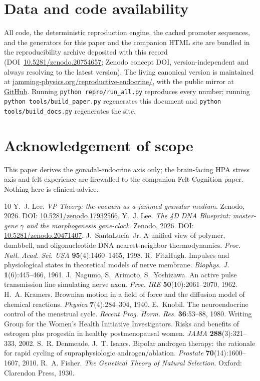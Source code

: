 \documentclass[11pt]{article}
\begin{document}
\section*{Data and code availability}
All code, the deterministic reproduction engine, the cached promoter sequences, and the generators for this
paper and the companion HTML site are bundled in the reproducibility archive deposited with this record
(DOI~\href{https://doi.org/10.5281/zenodo.20754657}{10.5281/zenodo.20754657}; Zenodo concept DOI, version-independent and
always resolving to the latest version). The living canonical version is maintained at
\href{https://jamming-physics.org/reproductive-endocrine/}{jamming-physics.org/reproductive-endocrine/}, with the public mirror at
\href{https://github.com/rego093-sketch/jamming-physics/tree/main/repro/reproductive-endocrine}{GitHub}. Running \texttt{python repro/run\_all.py} reproduces every number; running
\texttt{python tools/build\_paper.py} regenerates this document and \texttt{python tools/build\_docs.py}
regenerates the site.

\section*{Acknowledgement of scope}
This paper derives the gonadal-endocrine axis only; the brain-facing HPA stress axis and felt experience are
firewalled to the companion Felt Cognition paper. Nothing here is clinical advice.

\begin{thebibliography}{10}
 Y.~J. Lee. \emph{VP Theory: the vacuum as a jammed granular medium}. Zenodo, 2026.
DOI: \href{https://doi.org/10.5281/zenodo.17932566}{10.5281/zenodo.17932566}.
 Y.~J. Lee. \emph{The 4D DNA Blueprint: master-gene $\gamma$ and the morphogenesis
gene-clock}. Zenodo, 2026. DOI: \href{https://doi.org/10.5281/zenodo.20471407}{10.5281/zenodo.20471407}.
 J.~SantaLucia~Jr. A unified view of polymer, dumbbell, and oligonucleotide DNA
nearest-neighbor thermodynamics. \emph{Proc. Natl. Acad. Sci. USA} \textbf{95}(4):1460--1465, 1998.
 R.~FitzHugh. Impulses and physiological states in theoretical models of nerve membrane.
\emph{Biophys. J.} \textbf{1}(6):445--466, 1961.
 J.~Nagumo, S.~Arimoto, S.~Yoshizawa. An active pulse transmission line simulating nerve
axon. \emph{Proc. IRE} \textbf{50}(10):2061--2070, 1962.
 H.~A. Kramers. Brownian motion in a field of force and the diffusion model of chemical
reactions. \emph{Physica} \textbf{7}(4):284--304, 1940.
 E.~Knobil. The neuroendocrine control of the menstrual cycle. \emph{Recent Prog. Horm. Res.}
\textbf{36}:53--88, 1980.
 Writing Group for the Women's Health Initiative Investigators. Risks and benefits of estrogen
plus progestin in healthy postmenopausal women. \emph{JAMA} \textbf{288}(3):321--333, 2002.
 S.~R. Denmeade, J.~T. Isaacs. Bipolar androgen therapy: the rationale for rapid cycling of
supraphysiologic androgen/ablation. \emph{Prostate} \textbf{70}(14):1600--1607, 2010.
 R.~A. Fisher. \emph{The Genetical Theory of Natural Selection}. Oxford: Clarendon Press, 1930.
\end{thebibliography}
\end{document}
